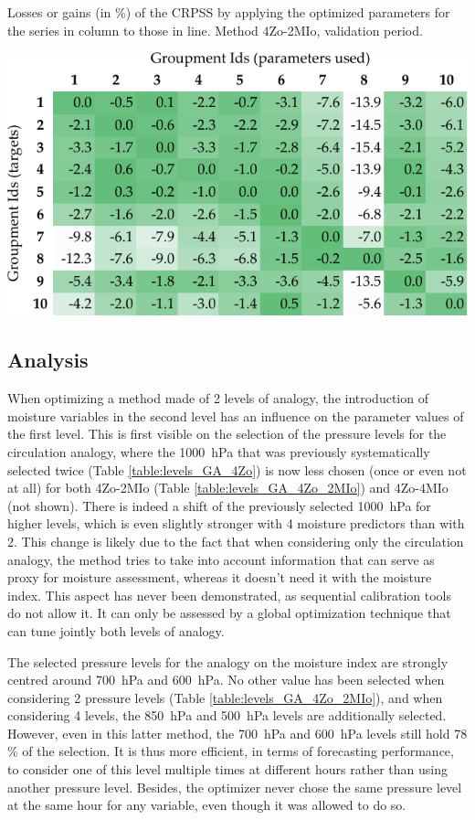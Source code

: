 \documentclass[5p]{elsarticle}
\begin{document}
\begin{table}[htb]
	\caption{Losses or gains (in \%) of the CRPSS by applying the optimized parameters for the series in column to those in line. Method 4Zo-2MIo, validation period.}
	\centerline{\includegraphics[width=\linewidth]{figures/table_crossing_z4-hi2_valid.pdf}}
	\label{table:crossing_4Zo-2MIo_valid}
\end{table}



\subsection{Analysis}

When optimizing a method made of 2 levels of analogy, the introduction of moisture variables in the second level has an influence on the parameter values of the first level. This is first visible on the selection of the pressure levels for the circulation analogy, where the 1000~hPa that was previously systematically selected twice (Table \ref{table:levels_GA_4Zo}) is now less chosen (once or even not at all) for both 4Zo-2MIo (Table \ref{table:levels_GA_4Zo_2MIo}) and 4Zo-4MIo (not shown). There is indeed a shift of the previously selected 1000~hPa for higher levels, which is even slightly stronger with 4 moisture predictors than with 2. This change is likely due to the fact that when considering only the circulation analogy, the method tries to take into account information that can serve as proxy for moisture assessment, whereas it doesn't need it with the moisture index. This aspect has never been demonstrated, as sequential calibration tools do not allow it. It can only be assessed by a global optimization technique that can tune jointly both levels of analogy. 

The selected pressure levels for the analogy on the moisture index are strongly centred around 700~hPa and 600~hPa. No other value has been selected when considering 2 pressure levels (Table \ref{table:levels_GA_4Zo_2MIo}), and when considering 4 levels, the 850~hPa and 500~hPa levels are additionally selected. However, even in this latter method, the 700~hPa and 600~hPa levels still hold 78 \% of the selection. It is thus more efficient, in terms of forecasting performance, to consider one of this level multiple times at different hours rather than using another pressure level. Besides, the optimizer never chose the same pressure level at the same hour for any variable, even though it was allowed to do so.
\end{document}
